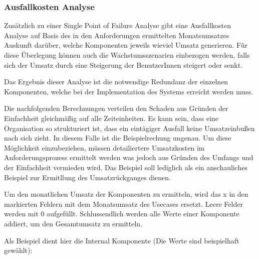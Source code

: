 \subsubsection{Ausfallkosten Analyse}
Zusätzlich zu einer Single Point of Failure Analyse gibt eine Ausfallkosten Analyse auf Basis des in den Anforderungen ermittelten Monatsumsatzes Auskunft darüber, welche Komponenten jeweils wieviel Umsatz generieren. Für diese Überlegung können auch die Wachstumsszenarien einbezogen werden, falls sich der Umsatz durch eine Steigerung der BenutzerInnen steigert oder senkt.

Das Ergebnis dieser Analyse ist die notwendige Redundanz der einzelnen Komponenten, welche bei der Implementation des Systems erreicht werden muss.

Die nachfolgenden Berechnungen verteilen den Schaden aus Gründen der Einfachheit gleichmäßig auf alle Zeiteinheiten. Es kann sein, dass eine Organisation so strukturiert ist, dass ein eintägiger Ausfall keine Umsatzeinbußen nach sich zieht. In diesem Falle ist die Beispielrechung ungenau. Um diese Möglichkeit einzubeziehen, müssen detailiertere Umsatzkosten im Anforderungsprozess ermittelt werden was jedoch aus Gründen des Umfangs und der Einfachheit vermieden wird. Das Beispiel soll lediglich als ein anschauliches Beispiel zur Ermitllung des Umsatzrückganges dienen.

Um den monatlichen Umsatz der Komponenten zu ermitteln, wird das x in den markierten Feldern mit dem Monatsumsatz des Usecases ersetzt. Leere Felder werden mit 0 aufgefüllt. Schlussendlich werden alle Werte einer Komponente addiert, um den Gesamtumsatz zu ermitteln.

Als Beispiel dient hier die Internal Komponente (Die Werte sind beispielhaft gewählt):

\hfill \break

